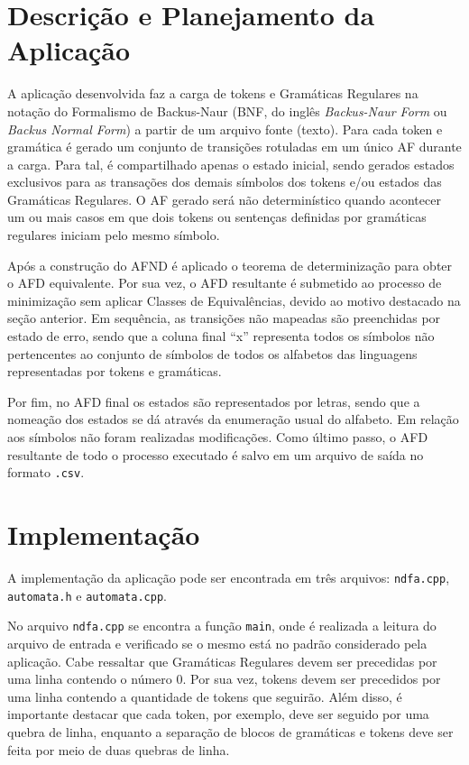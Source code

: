 \documentclass[12pt]{article}
\begin{document}
\section{Descrição e Planejamento da Aplicação}
\label{3}

A aplicação desenvolvida faz a carga de tokens e Gramáticas Regulares na notação do Formalismo de Backus-Naur (BNF, do inglês {\it Backus-Naur Form} ou {\it Backus Normal Form}) a partir de um arquivo fonte (texto). Para cada token e gramática é gerado um conjunto de transições rotuladas em um único AF durante a carga. Para tal, é compartilhado apenas o estado inicial, sendo gerados estados exclusivos para as transações dos demais símbolos dos tokens e/ou estados das Gramáticas Regulares. O AF gerado será não determinístico quando acontecer um ou mais casos em que dois tokens ou sentenças definidas por gramáticas regulares iniciam pelo mesmo símbolo.

Após a construção do AFND é aplicado o teorema de determinização para obter o AFD equivalente. Por sua vez, o AFD resultante é submetido ao processo de minimização sem aplicar Classes de Equivalências, devido ao motivo destacado na seção anterior. Em sequência, as transições não mapeadas são preenchidas por estado de erro, sendo que a coluna final ``x'' representa todos os símbolos não pertencentes ao conjunto de símbolos de todos os alfabetos das linguagens representadas por tokens e gramáticas.

Por fim, no AFD final os estados são representados por letras, sendo que a nomeação dos estados se dá através da enumeração usual do alfabeto. Em relação aos símbolos não foram realizadas modificações. Como último passo, o AFD resultante de todo o processo executado é salvo em um arquivo de saída no formato \texttt{.csv}.

\section{Implementação}
\label{4}

A implementação da aplicação pode ser encontrada em três arquivos: \texttt{ndfa.cpp}, \texttt{automata.h} e \texttt{automata.cpp}.

No arquivo \texttt{ndfa.cpp} se encontra a função \texttt{main}, onde é realizada a leitura do arquivo de entrada e verificado se o mesmo está no padrão considerado pela aplicação. Cabe ressaltar que Gramáticas Regulares devem ser precedidas por uma linha contendo o número $0$. Por sua vez, tokens devem ser precedidos por uma linha contendo a quantidade de tokens que seguirão. Além disso, é importante destacar que cada token, por exemplo, deve ser seguido por uma quebra de linha, enquanto a separação de blocos de gramáticas e tokens deve ser feita por meio de duas quebras de linha.
\end{document}
